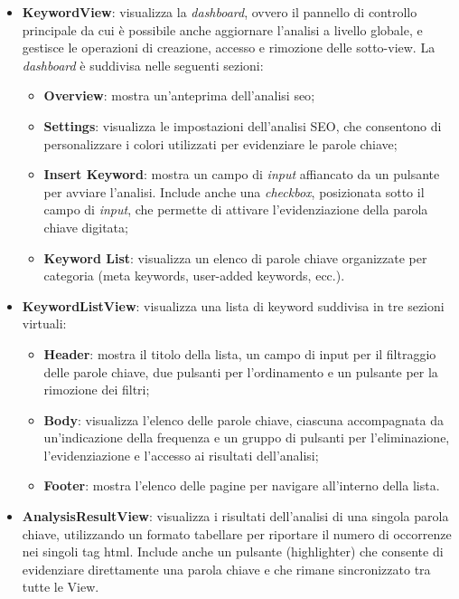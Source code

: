 \begin{itemize}
  \item \textbf{KeywordView}: visualizza la \textit{dashboard}, ovvero il pannello di controllo principale da cui è possibile anche aggiornare l’analisi a livello globale, e gestisce le operazioni di creazione, accesso e rimozione delle sotto-view. La \textit{dashboard} è suddivisa nelle seguenti sezioni:
  \begin{itemize}
    \item \textbf{Overview}: mostra un’anteprima dell’analisi \gls{seo};
    \item \textbf{Settings}: visualizza le impostazioni dell’analisi SEO, che consentono di personalizzare i colori utilizzati per evidenziare le parole chiave;
    \item \textbf{Insert Keyword}: mostra un campo di \textit{input} affiancato da un pulsante per avviare l’analisi. Include anche una \textit{checkbox}, posizionata sotto il campo di \textit{input}, che permette di attivare l’evidenziazione della parola chiave digitata;
    \item \textbf{Keyword List}: visualizza un elenco di parole chiave organizzate per categoria (meta keywords, user-added keywords, ecc.).
  \end{itemize}
  \item \textbf{KeywordListView}: visualizza una lista di keyword suddivisa in tre sezioni virtuali:
  \begin{itemize}
    \item \textbf{Header}: mostra il titolo della lista, un campo di input per il filtraggio delle parole chiave, due pulsanti per l’ordinamento e un pulsante per la rimozione dei filtri;
    \item \textbf{Body}: visualizza l’elenco delle parole chiave, ciascuna accompagnata da un’indicazione della frequenza e un gruppo di pulsanti per l’eliminazione, l’evidenziazione e l’accesso ai risultati dell’analisi;
    \item \textbf{Footer}: mostra l’elenco delle pagine per navigare all’interno della lista.
  \end{itemize}
  \item \textbf{AnalysisResultView}: visualizza i risultati dell’analisi di una singola parola chiave, utilizzando un formato tabellare per riportare il numero di occorrenze nei singoli tag \gls{html}. Include anche un pulsante (highlighter) che consente di evidenziare direttamente una parola chiave e che rimane sincronizzato tra tutte le View.
\end{itemize}

